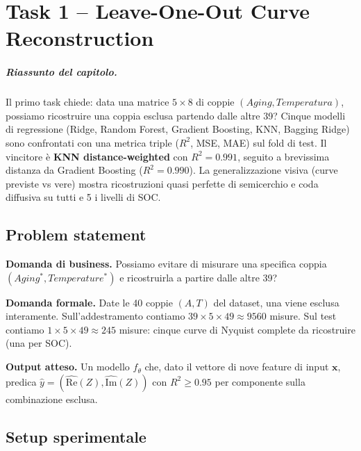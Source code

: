 \chapter{Task 1 -- Leave-One-Out Curve Reconstruction}
\label{chap:task1}

\paragraph{Riassunto del capitolo.} Il primo task chiede: data una
matrice $5 \times 8$ di coppie $(Aging, Temperatura)$, possiamo
ricostruire una coppia esclusa partendo dalle altre 39? Cinque modelli
di regressione (Ridge, Random Forest, Gradient Boosting, KNN, Bagging
Ridge) sono confrontati con una metrica triple ($R^{2}$, MSE, MAE) sul
fold di test. Il vincitore è \textbf{KNN distance-weighted} con
$R^{2} = 0.991$, seguito a brevissima distanza da Gradient Boosting
($R^{2} = 0.990$). La generalizzazione visiva (curve previste vs vere)
mostra ricostruzioni quasi perfette di semicerchio e coda diffusiva su
tutti e 5 i livelli di SOC.

\section{Problem statement}

\textbf{Domanda di business.} Possiamo evitare di misurare una specifica
coppia $(Aging^*, Temperature^*)$ e ricostruirla a partire dalle altre 39?

\textbf{Domanda formale.} Date le 40 coppie $(A, T)$ del dataset, una
viene esclusa interamente. Sull'addestramento contiamo
$39 \times 5 \times 49 \approx 9560$ misure. Sul test contiamo
$1 \times 5 \times 49 \approx 245$ misure: cinque curve di Nyquist
complete da ricostruire (una per SOC).

\textbf{Output atteso.} Un modello $f_\theta$ che, dato il vettore di nove
feature di input $\mathbf{x}$, predica $\hat{y} = (\widehat{\mathrm{Re}}(Z),
\widehat{\mathrm{Im}}(Z))$ con $R^{2} \geq 0.95$ per componente sulla
combinazione esclusa.

\section{Setup sperimentale}

